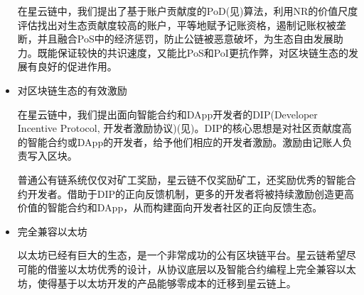 \begin{itemize}
在星云链中，我们提出了基于账户贡献度的PoD(见)算法，利用NR的价值尺度评估找出对生态贡献度较高的账户，平等地赋予记账资格，遏制记账权被垄断，并且融合PoS中的经济惩罚，防止公链被恶意破坏，为生态自由发展助力。既能保证较快的共识速度，又能比PoS和PoI更抗作弊，对区块链生态的发展有良好的促进作用。

	\item 对区块链生态的有效激励

在星云链中，我们提出面向智能合约和DApp开发者的DIP(Developer Incentive Protocol, 开发者激励协议)(见)。DIP的核心思想是对社区贡献度高的智能合约或DApp的开发者，给予他们相应的开发者激励。激励由记账人负责写入区块。

普通公有链系统仅仅对矿工奖励，星云链不仅奖励矿工，还奖励优秀的智能合约开发者。借助于DIP的正向反馈机制，更多的开发者将被持续激励创造更高价值的智能合约和DApp，从而构建面向开发者社区的正向反馈生态。

	\item 完全兼容以太坊

以太坊已经有巨大的生态，是一个非常成功的公有区块链平台。星云链希望尽可能的借鉴以太坊优秀的设计，从协议底层以及智能合约编程上完全兼容以太坊，使得基于以太坊开发的产品能够零成本的迁移到星云链上。

\end{itemize}
